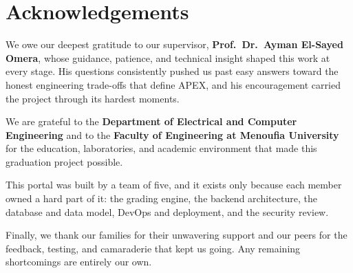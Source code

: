 \chapter*{Acknowledgements}

We owe our deepest gratitude to our supervisor, \textbf{Prof.~Dr.~Ayman El-Sayed Omera}, whose guidance, patience, and technical insight shaped this work at every stage. His questions consistently pushed us past easy answers toward the honest engineering trade-offs that define APEX, and his encouragement carried the project through its hardest moments.

We are grateful to the \textbf{Department of Electrical and Computer Engineering} and to the \textbf{Faculty of Engineering at Menoufia University} for the education, laboratories, and academic environment that made this graduation project possible.

This portal was built by a team of five, and it exists only because each member owned a hard part of it: the grading engine, the backend architecture, the database and data model, DevOps and deployment, and the security review.

Finally, we thank our families for their unwavering support and our peers for the feedback, testing, and camaraderie that kept us going. Any remaining shortcomings are entirely our own.
